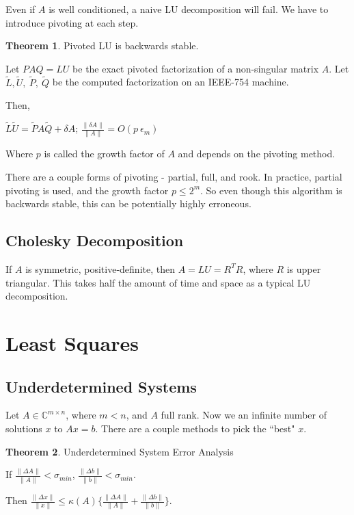 \documentclass{article}
\theoremstyle{definition}
\newtheorem{theorem}{Theorem}[section]
\begin{document}
Even if $A$ is well conditioned, a naive LU decomposition will fail. We have to introduce pivoting at each step. \newline

\begin{theorem} Pivoted LU is backwards stable.

Let $PAQ = LU$ be the exact pivoted factorization of a non-singular matrix $A$. Let $\tilde{L},\tilde{U},\ \tilde{P},\ \tilde{Q}$ be the computed factorization on an IEEE-754 machine. 

Then,

$\tilde{L}\tilde{U} = \tilde{P}A\tilde{Q} + \delta A$; $\frac{\|\delta A\|}{\|A\|} = O(p\ \epsilon_m)$

Where $p$ is called the growth factor of $A$ and depends on the pivoting method.

\end{theorem}

\vspace{3ex}
There are a couple forms of pivoting - partial, full, and rook. In practice, partial pivoting is used, and the growth factor $p \leq 2^m$. So even though this algorithm is backwards stable, this can be potentially highly erroneous.

\subsection{Cholesky Decomposition}

If $A$ is symmetric, positive-definite, then $A = LU = R^T R$, where $R$ is upper triangular. This takes half the amount of time and space as a typical LU decomposition.

\pagebreak

\section{Least Squares}

\subsection{Underdetermined Systems}

Let $A \in \mathbb{C}^{m \times n}$, where $m < n$, and $A$ full rank. Now we an infinite number of solutions $x$ to $Ax = b$. There are a couple methods to pick the ``best" $x$. \newline

\begin{theorem} Underdetermined System Error Analysis

    If $\frac{\|\Delta A\|}{\|A\|} < \sigma_{min}$, $\frac{\|\Delta b\|}{\|b\|} < \sigma_{min}$.
    
    Then $\frac{\|\Delta x\|}{\|x\|} \leq \kappa(A) \big\{ \frac{\|\Delta A\|}{\|A\|} + \frac{\|\Delta b\|}{\|b\|} \big\}$.
\end{theorem}
\end{document}
